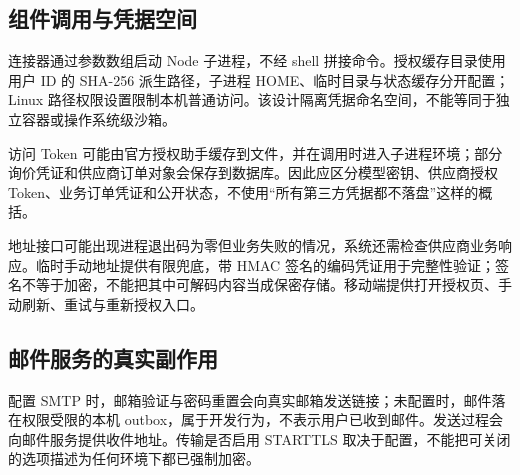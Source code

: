 \subsection{组件调用与凭据空间}
连接器通过参数数组启动 Node 子进程，不经 shell 拼接命令。授权缓存目录使用用户 ID 的 SHA-256 派生路径，子进程 HOME、临时目录与状态缓存分开配置；Linux 路径权限设置限制本机普通访问。该设计隔离凭据命名空间，不能等同于独立容器或操作系统级沙箱。

访问 Token 可能由官方授权助手缓存到文件，并在调用时进入子进程环境；部分询价凭证和供应商订单对象会保存到数据库。因此应区分模型密钥、供应商授权 Token、业务订单凭证和公开状态，不使用“所有第三方凭据都不落盘”这样的概括。

地址接口可能出现进程退出码为零但业务失败的情况，系统还需检查供应商业务响应。临时手动地址提供有限兜底，带 HMAC 签名的编码凭证用于完整性验证；签名不等于加密，不能把其中可解码内容当成保密存储。移动端提供打开授权页、手动刷新、重试与重新授权入口。

\subsection{邮件服务的真实副作用}
配置 SMTP 时，邮箱验证与密码重置会向真实邮箱发送链接；未配置时，邮件落在权限受限的本机 outbox，属于开发行为，不表示用户已收到邮件。发送过程会向邮件服务提供收件地址。传输是否启用 STARTTLS 取决于配置，不能把可关闭的选项描述为任何环境下都已强制加密。
